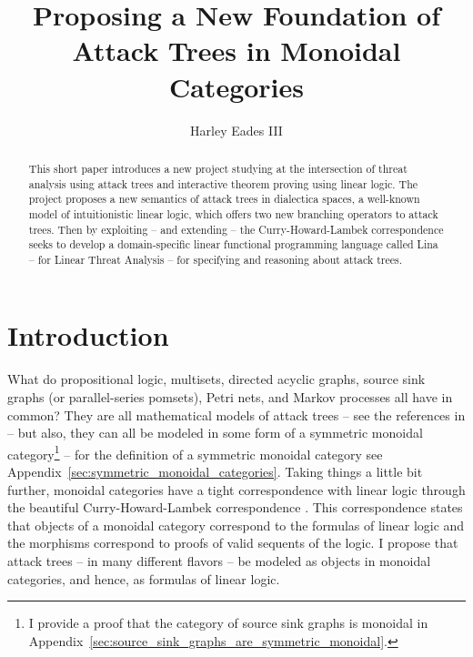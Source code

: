 \documentclass{llncs}
\date{}
\begin{document}
\title{Proposing a New Foundation of Attack Trees in Monoidal Categories}

\author{Harley Eades III}

\maketitle 

\begin{abstract}
  This short paper introduces a new project studying at the
  intersection of threat analysis using attack trees and interactive
  theorem proving using linear logic.  The project proposes a new
  semantics of attack trees in dialectica spaces, a well-known model
  of intuitionistic linear logic, which offers two new branching
  operators to attack trees.  Then by exploiting -- and extending --
  the Curry-Howard-Lambek correspondence seeks to develop a
  domain-specific linear functional programming language called Lina
  -- for Linear Threat Analysis -- for specifying and reasoning about
  attack trees.
\end{abstract}

\section{Introduction}
\label{sec:introduction}

What do propositional logic, multisets, directed acyclic graphs,
source sink graphs (or parallel-series pomsets), Petri nets, and
Markov processes all have in common?  They are all mathematical models
of attack trees -- see the references in
\cite{Kordy:2014a,Jhawar:2015} -- but also, they can all be modeled in
some form of a symmetric monoidal category\footnote{I provide a proof
  that the category of source sink graphs is monoidal in
  Appendix~\ref{sec:source_sink_graphs_are_symmetric_monoidal}.}
\cite{Tzouvaras:1998,Brown:1991,Fiore:2013,FrancescoAlbasini2010} --
for the definition of a symmetric monoidal category see
Appendix~\ref{sec:symmetric_monoidal_categories}.  Taking things a
little bit further, monoidal categories have a tight correspondence
with linear logic through the beautiful Curry-Howard-Lambek
correspondence \cite{MSC:4439568}.  This correspondence states that
objects of a monoidal category correspond to the formulas of linear
logic and the morphisms correspond to proofs of valid sequents of the
logic.  I propose that attack trees -- in many different flavors -- be
modeled as objects in monoidal categories, and hence, as formulas of
linear logic.
\end{document}
